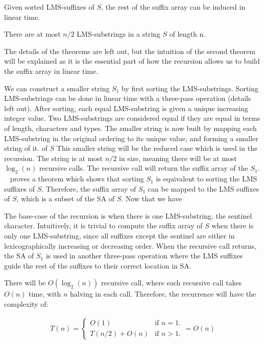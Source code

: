 \begin{theorem}
    Given sorted LMS-suffixes of $S$, the rest of the suffix array can be induced in linear
    time. 
\end{theorem}

\begin{theorem}
    There are at most $n / 2$ LMS-substrings in a string $S$ of length n.
\end{theorem}

The details of the theorems are left out, but the intuition of the second theorem will be
explained as it is the essential part of how the recursion allows us to build the suffix
array in linear time.

We can construct a smaller string $S_1$ by first sorting the LMS-substrings. Sorting
LMS-substrings can be done in linear time with a three-pass operation (details left out).
After sorting, each equal LMS-substring is given a unique increasing integer value. Two
LMS-substrings are considered equal if they are equal in terms of length, characters and
types. The smaller string is now built by mapping each LMS-substring in the original
ordering to its unique value, and forming a smaller string of it. of $S$ This smaller
string will be the reduced case which is used in the recursion. The string is at most $n /
2$ in size, meaning there will be at most $\log_2(n)$ recursive calls. The recursive call
will return the suffix array of the $S_1$. ~\cite{SuffixArrayConstruction} proves a
theorem which shows that sorting $S_1$ is equivalent to sorting the LMS suffixes of $S$.
Therefore, the suffix array of $S_1$ can be mapped to the LMS suffixes of $S$, which is a
subset of the SA of $S$. Now that we have

The base-case of the recursion is when there is one LMS-substring, the sentinel
character. Intuitively, it is trivial to compute the suffix array of $S$ when there is
only one LMS-substring, since all suffixes except the sentinel are either in
lexicographically increasing or decreasing order. When the recursive call returns, the SA
of $S_1$ is used in another three-pass operation where the LMS suffixes guide the rest of
the suffixes to their correct location in SA.

There will be $O(\log_2(n))$ recursive call, where each recursive call takes $O(n)$ time,
with $n$ halving in each call. Therefore, the recurrence will have the complexity of:

\begin{gather*}
    T(n) =
\begin{cases}
    O(1) & \text{if } n = 1. \\
    T(n / 2) + O(n) & \text{if } n > 1.
\end{cases}
= O(n)
\end{gather*}

